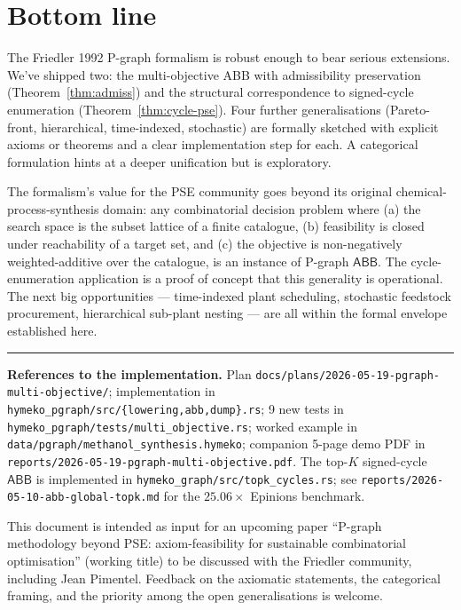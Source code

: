 \documentclass[11pt,a4paper]{article}
\theoremstyle{plain}
\theoremstyle{definition}
\newcommand{\code}[1]{\texttt{\small #1}}
\newcommand{\abb}{\textsf{ABB}}
\begin{document}
\section{Bottom line}
\label{sec:bottom}

The Friedler 1992 P-graph formalism is robust enough to bear
serious extensions. We've shipped two: the multi-objective ABB
with admissibility preservation (Theorem~\ref{thm:admiss}) and the
structural correspondence to signed-cycle enumeration
(Theorem~\ref{thm:cycle-pse}). Four further generalisations
(Pareto-front, hierarchical, time-indexed, stochastic) are
formally sketched with explicit axioms or theorems and a clear
implementation step for each. A categorical formulation hints at
a deeper unification but is exploratory.

The formalism's value for the PSE community goes beyond its
original chemical-process-synthesis domain: any combinatorial
decision problem where (a) the search space is the subset lattice
of a finite catalogue, (b) feasibility is closed under reachability
of a target set, and (c) the objective is non-negatively
weighted-additive over the catalogue, is an instance of
P-graph $\abb$. The cycle-enumeration application is a proof of
concept that this generality is operational. The next big
opportunities --- time-indexed plant scheduling, stochastic
feedstock procurement, hierarchical sub-plant nesting --- are all
within the formal envelope established here.

\vspace{8pt}\hrule\vspace{3pt}
\noindent\footnotesize
\textbf{References to the implementation.} Plan
\code{docs/plans/2026-05-19-pgraph-multi-objective/};
implementation in
\code{hymeko\_pgraph/src/\{lowering,abb,dump\}.rs};
9 new tests in
\code{hymeko\_pgraph/tests/multi\_objective.rs};
worked example in
\code{data/pgraph/methanol\_synthesis.hymeko};
companion 5-page demo PDF in
\code{reports/2026-05-19-pgraph-multi-objective.pdf}. The
top-$K$ signed-cycle $\abb$ is implemented in
\code{hymeko\_graph/src/topk\_cycles.rs}; see
\code{reports/2026-05-10-abb-global-topk.md} for the
$25.06\times$ Epinions benchmark.

\medskip
\noindent
This document is intended as input for an upcoming paper
``P-graph methodology beyond PSE: axiom-feasibility for
sustainable combinatorial optimisation'' (working title) to be
discussed with the Friedler community, including Jean Pimentel.
Feedback on the axiomatic statements, the categorical framing,
and the priority among the open generalisations is welcome.
\end{document}
